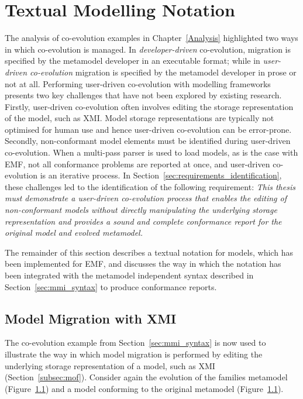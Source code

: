 
\section{Textual Modelling Notation}
\label{sec:notation}
The analysis of co-evolution examples in Chapter~\ref{Analysis} highlighted two ways in which co-evolution is managed. In \emph{developer-driven} co-evolution, migration is specified by the metamodel developer in an executable format; while in \emph{user-driven co-evolution} migration is specified by the metamodel developer in prose or not at all. Performing user-driven co-evolution with modelling frameworks presents two key challenges that have not been explored by existing research. Firstly, user-driven co-evolution often involves editing the storage representation of the model, such as XMI. Model storage representations are typically not optimised for human use and hence user-driven co-evolution can be error-prone. Secondly, non-conformant model elements must be identified during user-driven co-evolution. When a multi-pass parser is used to load models, as is the case with EMF, not all conformance problems are reported at once, and user-driven co-evolution is an iterative process. In Section~\ref{sec:requirements_identification}, these challenges led to the identification of the following requirement: \emph{This thesis must demonstrate a user-driven co-evolution process that enables the editing of non-conformant models without directly manipulating the underlying storage representation and provides a sound and complete conformance report for the original model and evolved metamodel.}

The remainder of this section describes a textual notation for models, which has been implemented for EMF, and discusses the way in which the notation has been integrated with the metamodel independent syntax described in Section~\ref{sec:mmi_syntax} to produce conformance reports. 

\subsection{Model Migration with XMI}
The co-evolution example from Section~\ref{sec:mmi_syntax} is now used to illustrate the way in which model migration is performed by editing the underlying storage representation of a model, such as XMI (Section~\ref{subsec:mof}). Consider again the evolution of the families metamodel (Figure~\ref{}) and a model conforming to the original metamodel (Figure~\ref{}).


